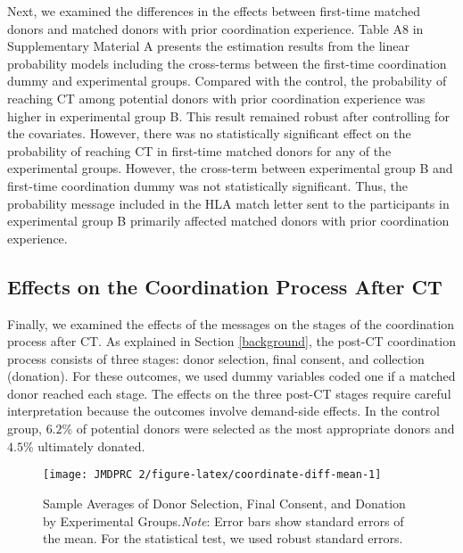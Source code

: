 \documentclass[12pt, a4paper]{article}
\begin{document}
Next, we examined the differences in the effects between first-time matched donors and matched donors with prior coordination experience. Table A8 in Supplementary Material A presents the estimation results from the linear probability models including the cross-terms between the first-time coordination dummy and experimental groups. Compared with the control, the probability of reaching CT among potential donors with prior coordination experience was higher in experimental group B. This result remained robust after controlling for the covariates. However, there was no statistically significant effect on the probability of reaching CT in first-time matched donors for any of the experimental groups. However, the cross-term between experimental group B and first-time coordination dummy was not statistically significant. Thus, the probability message included in the HLA match letter sent to the participants in experimental group B primarily affected matched donors with prior coordination experience.

\subsection{Effects on the Coordination Process After CT}\label{process}

Finally, we examined the effects of the messages on the stages of the coordination process after CT. As explained in Section \ref{background}, the post-CT coordination process consists of three stages: donor selection, final consent, and collection (donation). For these outcomes, we used dummy variables coded one if a matched donor reached each stage. The effects on the three post-CT stages require careful interpretation because the outcomes involve demand-side effects. In the control group, \(6.2\)\% of potential donors were selected as the most appropriate donors and \(4.5\)\% ultimately donated.

\begin{figure}[t]
\texttt{[image: JMDPRC~2/figure-latex/coordinate-diff-mean-1]} \caption{Sample Averages of Donor Selection, Final Consent, and Donation by Experimental Groups.\newline \emph{Note}: Error bars show standard errors of the mean. For the statistical test, we used robust standard errors.}\label{fig:coordinate-diff-mean}
\end{figure}
\end{document}
